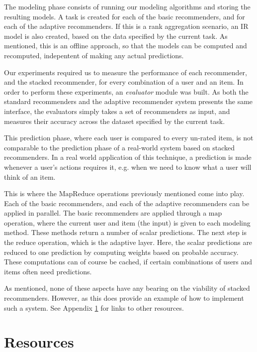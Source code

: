 The modeling phase consists of running our modeling algorithms and storing the resulting models.
A task is created for each of the basic recommenders, and for each of the adaptive recommenders.
If this is a rank aggregation scenario, an IR model is also created, based on the data
specified by the current task.
As mentioned, this is an offline approach, so that the models can be computed and recomputed,
indepentent of making any actual predictions.

Our experiments required us to measure the performance of each
recommender, and the stacked recommender, for every combination of 
a user and an item.
In order to perform these experiments, an \emph{evaluator} module was built.
As both the standard recommenders and the adaptive recommender system presents the same 
interface, the evaluators simply takes a set of recommenders as input, 
and measures their accuracy across the dataset specified by the current task.

This prediction phase, where each user is compared to every un-rated item,
is not comparable to the prediction phase of a real-world system
based on stacked recommenders. In a real world application of this technique,
a prediction is made whenever a user's actions requires it,
e.g. when we need to know what a user will think of an item.

This is where the $\mathrm{MapReduce}$ operations previously mentioned come into play.
Each of the basic recommenders, and each of the adaptive recommenders can be applied in parallel.
The basic recommenders are applied through a $\mathrm{map}$ operation, where the current user and item (the input)
is given to each modeling method. These methods return a number of scalar predictions.
The next step is the $\mathrm{reduce}$ operation, which is the adaptive layer.
Here, the scalar predictions are reduced to one prediction by computing weights
based on probable accuracy.
These computations can of course be cached, if certain combinations of users and items
often need predictions.

As mentioned, none of these aspects have any bearing on the viability of stacked recommenders.
However, as this does provide an example of how to implement such a system. 
See Appendix \ref{appendix:resources} for links to other resources. 



\chapter{Resources}
\label{appendix:resources}

